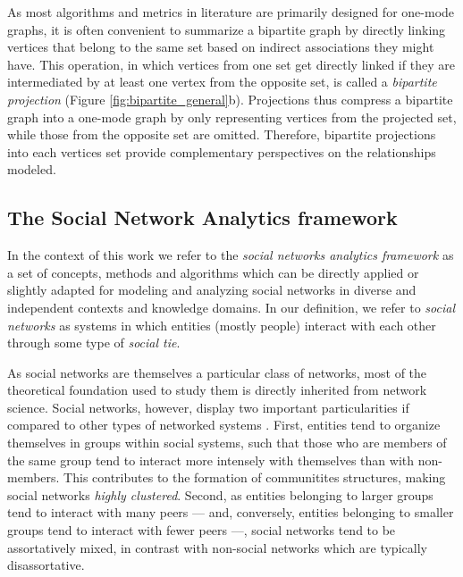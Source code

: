 As most algorithms and metrics in literature are primarily designed for one-mode graphs, it is often convenient to summarize a bipartite graph by directly linking vertices that belong to the same set based on indirect associations they might have. 
This operation, in which vertices from one set get directly linked if they are intermediated by at least one vertex from the opposite set, is called a \textit{bipartite projection} (Figure \ref{fig:bipartite_general}b).
Projections thus compress a bipartite graph into a one-mode graph by only representing vertices from the projected set, while those from the opposite set are omitted.
Therefore, bipartite projections into each vertices set provide complementary perspectives on the relationships modeled.
%





\subsection{The Social Network Analytics framework}
In the context of this work we refer to the \textit{social networks analytics framework} as a set of concepts, methods and algorithms which can be directly applied or slightly adapted for modeling and analyzing social networks in diverse and independent contexts and knowledge domains.
%
In our definition, we refer to \textit{social networks} as systems in which entities (mostly people) interact with each other through some type of \textit{social tie}.

As social networks are themselves a particular class of networks, most of the theoretical foundation used to study them is directly inherited from network science.
%
Social networks, however, display two important particularities if compared to other types of networked systems \cite{Newman2003d}.
First, entities tend to organize themselves in groups within social systems, such that those who are members of the same group tend to interact more intensely with themselves than with non-members.
This contributes to the formation of communitites structures, making social networks \textit{highly clustered}.
Second, as entities belonging to larger groups tend to interact with many peers --- and, conversely, entities belonging to smaller groups tend to interact with fewer peers ---, social networks tend to be assortatively mixed, in contrast with non-social networks which are typically disassortative.  

